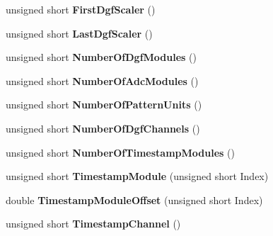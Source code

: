 \begin{DoxyCompactItemize}
\item 
\hypertarget{class_global_settings_a216b8164c02a1de1d5437df565cb9485}{unsigned short {\bfseries First\-Dgf\-Scaler} ()}\label{class_global_settings_a216b8164c02a1de1d5437df565cb9485}

\item 
\hypertarget{class_global_settings_a808e23c6df71ad3156777d8f6e3232b4}{unsigned short {\bfseries Last\-Dgf\-Scaler} ()}\label{class_global_settings_a808e23c6df71ad3156777d8f6e3232b4}

\item 
\hypertarget{class_global_settings_ad3c488b383c9894b0f40747da7a32613}{unsigned short {\bfseries Number\-Of\-Dgf\-Modules} ()}\label{class_global_settings_ad3c488b383c9894b0f40747da7a32613}

\item 
\hypertarget{class_global_settings_a0036e842692c336fcd4fd918b180f708}{unsigned short {\bfseries Number\-Of\-Adc\-Modules} ()}\label{class_global_settings_a0036e842692c336fcd4fd918b180f708}

\item 
\hypertarget{class_global_settings_a7706b4e61b18ee710e025229b99002c6}{unsigned short {\bfseries Number\-Of\-Pattern\-Units} ()}\label{class_global_settings_a7706b4e61b18ee710e025229b99002c6}

\item 
\hypertarget{class_global_settings_a47372087c05f31209288e4cac4b1ce04}{unsigned short {\bfseries Number\-Of\-Dgf\-Channels} ()}\label{class_global_settings_a47372087c05f31209288e4cac4b1ce04}

\item 
\hypertarget{class_global_settings_a5d61c4fefad9ffe29a9a296641bf1f3c}{unsigned short {\bfseries Number\-Of\-Timestamp\-Modules} ()}\label{class_global_settings_a5d61c4fefad9ffe29a9a296641bf1f3c}

\item 
\hypertarget{class_global_settings_abb55f0b2ec5c870d739e86cbf9496b7d}{unsigned short {\bfseries Timestamp\-Module} (unsigned short Index)}\label{class_global_settings_abb55f0b2ec5c870d739e86cbf9496b7d}

\item 
\hypertarget{class_global_settings_a10705cb601c558b8a5e6bc6344eaa5ad}{double {\bfseries Timestamp\-Module\-Offset} (unsigned short Index)}\label{class_global_settings_a10705cb601c558b8a5e6bc6344eaa5ad}

\item 
\hypertarget{class_global_settings_aaab0288f44318a1ad732edabd1bdf2f4}{unsigned short {\bfseries Timestamp\-Channel} ()}\label{class_global_settings_aaab0288f44318a1ad732edabd1bdf2f4}


\end{DoxyCompactItemize}
